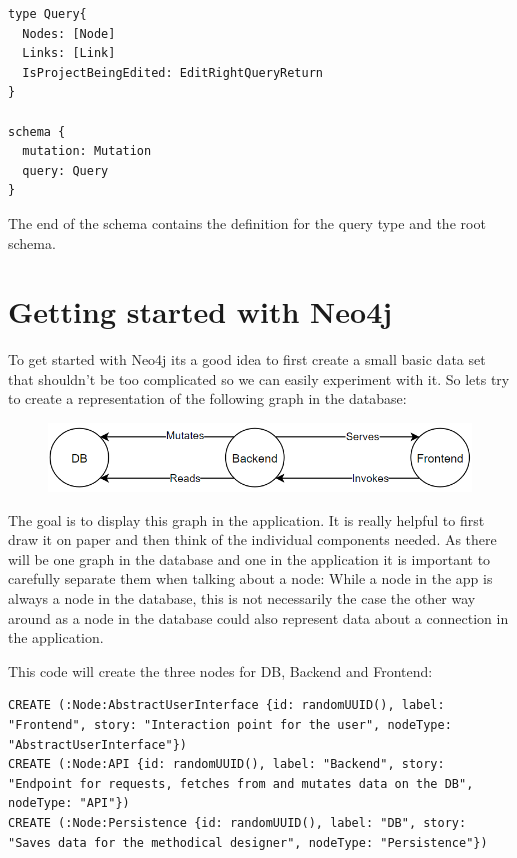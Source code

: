 \begin{lstlisting}[caption={Root Type Definitions}]
type Query{
  Nodes: [Node]
  Links: [Link]
  IsProjectBeingEdited: EditRightQueryReturn
}

schema {
  mutation: Mutation
  query: Query
}
\end{lstlisting}

The end of the schema contains the definition for the query type and the root schema.

\section{Getting started with Neo4j}
To get started with Neo4j its a good idea to first create a small basic data set that shouldn't be too complicated so we can easily experiment with it. So lets try to create a representation of the following graph in the database:

\begin{figure}[H]
\centering
\includegraphics[scale=.8]{Bilder/BasicGraph.png}
\label{ex421}
\end{figure}

The goal is to display this graph in the application. It is really helpful to first draw it on paper and then think of the individual components needed. As there will be one graph in the database and one in the application it is important to carefully separate them when talking about a node: While a node in the app is always a node in the database, this is not necessarily the case the other way around as a node in the database could also represent data about a connection in the application.

This code will create the three nodes for DB, Backend and Frontend:
\lstset{language=Cypher}
\begin{lstlisting}[caption={Cypher Statements to Create the Nodes}]
CREATE (:Node:AbstractUserInterface {id: randomUUID(), label: "Frontend", story: "Interaction point for the user", nodeType: "AbstractUserInterface"})
CREATE (:Node:API {id: randomUUID(), label: "Backend", story: "Endpoint for requests, fetches from and mutates data on the DB", nodeType: "API"})
CREATE (:Node:Persistence {id: randomUUID(), label: "DB", story: "Saves data for the methodical designer", nodeType: "Persistence"})
\end{lstlisting}

